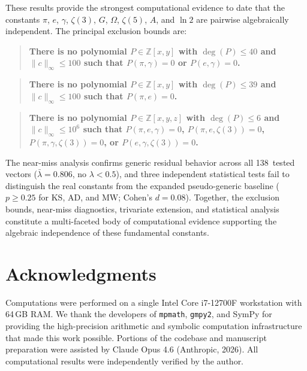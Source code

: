 \documentclass[11pt]{amsart}
\theoremstyle{remark}
\newcommand{\Z}{\mathbb{Z}}
\newcommand{\norm}[1]{\lVert #1 \rVert}
\begin{document}
These results provide the strongest computational evidence to date that the constants
$\pi$, $e$, $\gamma$, $\zeta(3)$, $G$, $\Omega$, $\zeta(5)$, $A$, and $\ln 2$ are
pairwise algebraically independent. The principal exclusion bounds are:

\begin{quote}
\textbf{There is no polynomial $P\in\Z[x,y]$ with $\deg(P)\le 40$ and
$\norm{c}_\infty\le 100$ such that $P(\pi,\gamma)=0$ or $P(e,\gamma)=0$.}
\end{quote}

\begin{quote}
\textbf{There is no polynomial $P\in\Z[x,y]$ with $\deg(P)\le 39$ and
$\norm{c}_\infty\le 100$ such that $P(\pi,e)=0$.}
\end{quote}

\begin{quote}
\textbf{There is no polynomial $P\in\Z[x,y,z]$ with $\deg(P)\le 6$ and
$\norm{c}_\infty\le 10^6$ such that $P(\pi,e,\gamma)=0$,
$P(\pi,e,\zeta(3))=0$, $P(\pi,\gamma,\zeta(3))=0$, or
$P(e,\gamma,\zeta(3))=0$.}
\end{quote}

The near-miss analysis confirms generic residual behavior across all 138~tested
vectors ($\bar\lambda = 0.806$, no $\lambda < 0.5$), and three independent
statistical tests fail to distinguish the real constants from the expanded
pseudo-generic baseline ($p \geq 0.25$ for KS, AD, and MW; Cohen's
$d = 0.08$). Together, the exclusion bounds, near-miss diagnostics, trivariate
extension, and statistical analysis constitute a multi-faceted body of
computational evidence supporting the algebraic independence of these
fundamental constants.

\section*{Acknowledgments}

Computations were performed on a single Intel Core i7-12700F workstation with 64\,GB
RAM. We thank the developers of \texttt{mpmath}, \texttt{gmpy2}, and SymPy for
providing the high-precision arithmetic and symbolic computation infrastructure that
made this work possible.
Portions of the codebase and manuscript preparation were assisted by
Claude Opus 4.6 (Anthropic, 2026). All computational results were
independently verified by the author.
\end{document}

